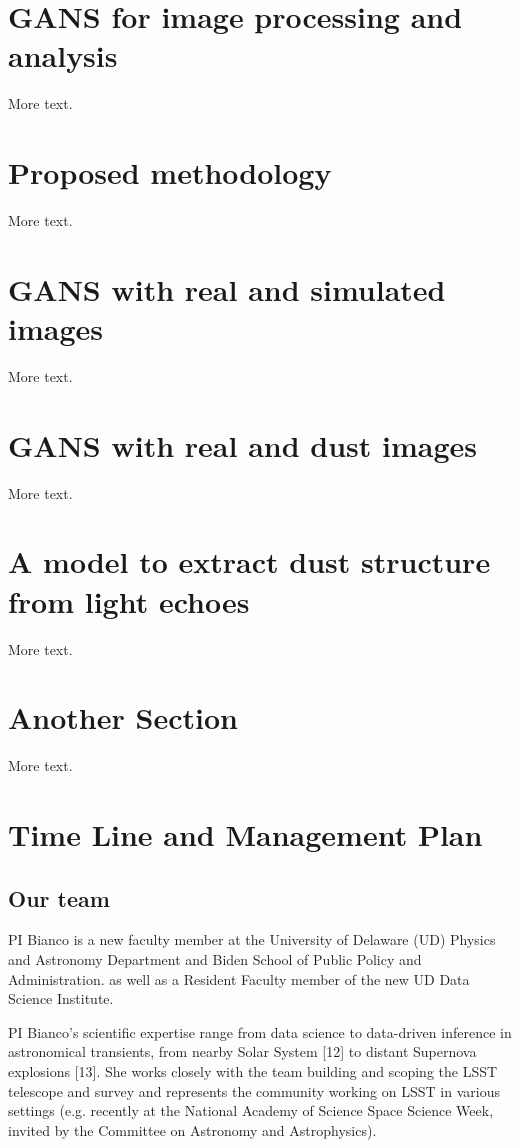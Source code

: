 \documentclass{proposalnsf}
\begin{document}
\section{GANS for image processing and analysis}

More text.

\section{Proposed methodology}

More text.
\section{GANS with real and simulated images}

More text.

\section{GANS with real and dust images}

More text.

\section{A model to extract dust structure from light echoes}


More text.

\section{Another Section}

More text.


\section{Time Line and Management Plan}

\subsection{Our team}
PI Bianco is a new faculty member at the University of Delaware (UD) Physics and Astronomy Department and Biden School of Public Policy and Administration. as well as a Resident Faculty member of the new UD Data Science Institute.

PI Bianco’s scientific expertise range from data science to data-driven inference in astronomical transients, from nearby Solar System [12] to distant Supernova explosions [13].  She works closely with the team building and scoping the LSST telescope and survey and represents the community working on LSST in various settings (e.g. recently at the National Academy of Science Space Science Week, invited by the Committee on Astronomy and Astrophysics). 
\end{document}

